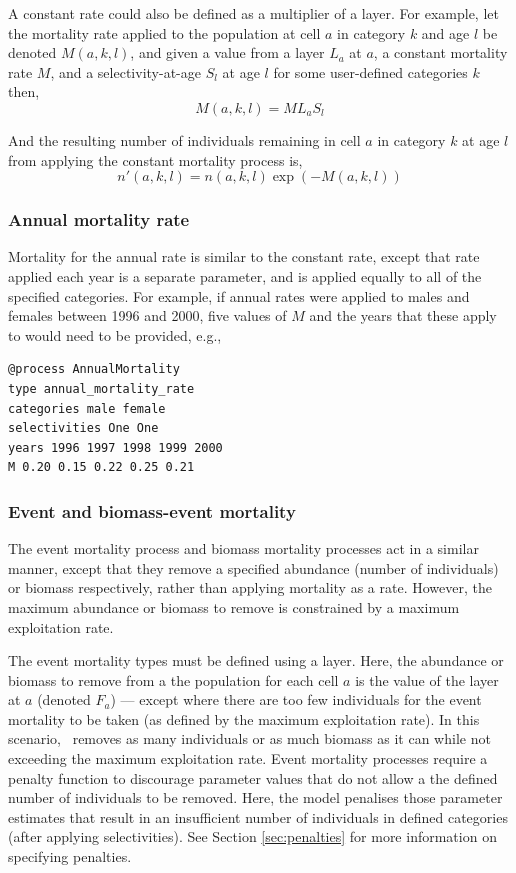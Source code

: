 A constant rate could also be defined as a multiplier of a layer. For example, let the mortality rate applied to the population at cell $a$ in category $k$ and age $l$ be denoted $M(a,k,l)$, and given a value from a layer $L_a$  at $a$, a constant mortality rate $M$, and a selectivity-at-age $S_l$ at age $l$ for some user-defined categories $k$ then, 
\begin{equation}
  M(a,k,l) = ML_a S_l 
\end{equation}

And the resulting number of individuals remaining in cell $a$ in category $k$ at age $l$ from applying the constant mortality process is,
\begin{equation}
  n'(a,k,l) = n(a,k,l) \exp \left({-M(a,k,l)}\right)
\end{equation}

\subsubsection*{Annual mortality rate}

Mortality for the annual rate is similar to the constant rate, except that rate applied each year is a separate parameter, and is applied equally to all of the specified categories. For example, if annual rates were applied to males and females between 1996 and 2000, five values of $M$ and the years that these apply to would need to be provided, e.g., 
{\small{\begin{verbatim}
@process AnnualMortality
type annual_mortality_rate
categories male female
selectivities One One
years 1996 1997 1998 1999 2000
M 0.20 0.15 0.22 0.25 0.21
\end{verbatim}}}

\subsubsection*{Event and biomass-event mortality}

The event mortality process and biomass mortality processes act in a similar manner, except that they remove a specified abundance (number of individuals) or biomass respectively, rather than applying mortality as a rate. However, the maximum abundance or biomass to remove is constrained by a maximum exploitation rate.

The event mortality types must be defined using a layer. Here, the abundance or biomass to remove from a the population for each cell $a$ is the value of the layer at $a$ (denoted $F_a$) --- except where there are too few individuals for the event mortality to be taken (as defined by the maximum exploitation rate). In this scenario, \SPM\ removes as many individuals or as much biomass as it can while not exceeding the maximum exploitation rate. Event mortality processes require a penalty function to discourage parameter values that do not allow a the defined number of individuals to be removed. Here, the model penalises those parameter estimates that result in an insufficient number of individuals in defined categories (after applying selectivities). See Section \ref{sec:penalties} for more information on specifying penalties.

